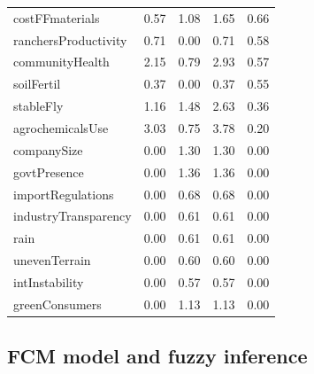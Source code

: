 \begin{table}[H]
{\begin{threeparttable}
\begin{tabular}{lcccc}
costFFmaterials            &      0.57 &       1.08 &        1.65 &    0.66 \\
ranchersProductivity       &      0.71 &       0.00 &        0.71 &    0.58 \\
communityHealth            &      2.15 &       0.79 &        2.93 &    0.57 \\
soilFertil                 &      0.37 &       0.00 &        0.37 &    0.55 \\
stableFly                  &      1.16 &       1.48 &        2.63 &    0.36 \\
agrochemicalsUse           &      3.03 &       0.75 &        3.78 &    0.20 \\
companySize                &      0.00 &       1.30 &        1.30 &    0.00 \\
govtPresence               &      0.00 &       1.36 &        1.36 &    0.00 \\
importRegulations          &      0.00 &       0.68 &        0.68 &    0.00 \\
industryTransparency       &      0.00 &       0.61 &        0.61 &    0.00 \\
rain                       &      0.00 &       0.61 &        0.61 &    0.00 \\
unevenTerrain              &      0.00 &       0.60 &        0.60 &    0.00 \\
intInstability             &      0.00 &       0.57 &        0.57 &    0.00 \\
greenConsumers             &      0.00 &       1.13 &        1.13 &    0.00 \\
 \hline \hline
\end{tabular}
\end{threeparttable}%
}
\end{table}

\subsection{FCM model and fuzzy inference}

